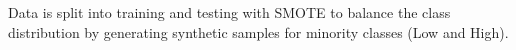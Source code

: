 \documentclass[preview]{standalone}
\begin{document}
Data is split into training and testing with SMOTE to balance the class \\distribution by generating synthetic samples for minority classes (Low and High).\\
\end{document}
